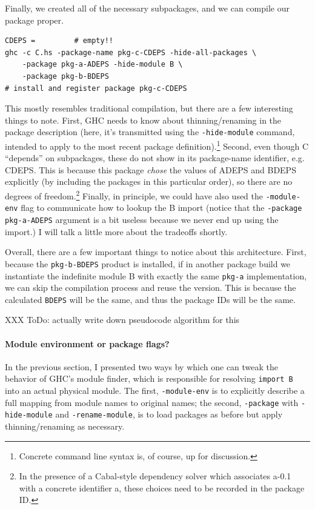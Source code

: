 \documentclass{article}
\begin{document}
Finally, we created all of the necessary subpackages, and we can compile
our package proper.

\begin{verbatim}
CDEPS =         # empty!!
ghc -c C.hs -package-name pkg-c-CDEPS -hide-all-packages \
    -package pkg-a-ADEPS -hide-module B \
    -package pkg-b-BDEPS
# install and register package pkg-c-CDEPS
\end{verbatim}

This mostly resembles traditional compilation, but there are a few
interesting things to note.  First, GHC needs to know about thinning/renaming
in the package description (here, it's transmitted using the \verb|-hide-module|
command, intended to apply to the most recent package definition).\footnote{Concrete
command line syntax is, of course, up for discussion.}  Second, even though C
``depends'' on subpackages, these do not show in its package-name identifier,
e.g. CDEPS\@.  This is because this package \emph{chose} the values of ADEPS and BDEPS
explicitly (by including the packages in this particular order), so there are no
degrees of freedom.\footnote{In the presence of a Cabal-style dependency solver
which associates a-0.1 with a concrete identifier a, these choices need to be
recorded in the package ID.}  Finally, in principle, we could have also used
the \verb|-module-env| flag to communicate how to lookup the B import (notice
that the \verb|-package pkg-a-ADEPS| argument is a bit useless because we
never end up using the import.)  I will talk a little more about the tradeoffs
shortly.

Overall, there are a few important things to notice about this architecture.
First, because the \verb|pkg-b-BDEPS| product is installed, if in another package
build we instantiate the indefinite module B with exactly the same \verb|pkg-a|
implementation, we can skip the compilation process and reuse the version.
This is because the calculated \verb|BDEPS| will be the same, and thus the package
IDs will be the same.

XXX ToDo: actually write down pseudocode algorithm for this

\paragraph{Module environment or package flags?}  In the previous
section, I presented two ways by which one can tweak the behavior of
GHC's module finder, which is responsible for resolving \verb|import B|
into an actual physical module.  The first, \verb|-module-env| is to
explicitly describe a full mapping from module names to original names;
the second, \verb|-package| with \verb|-hide-module| and
\verb|-rename-module|, is to load packages as before but apply
thinning/renaming as necessary.
\end{document}
